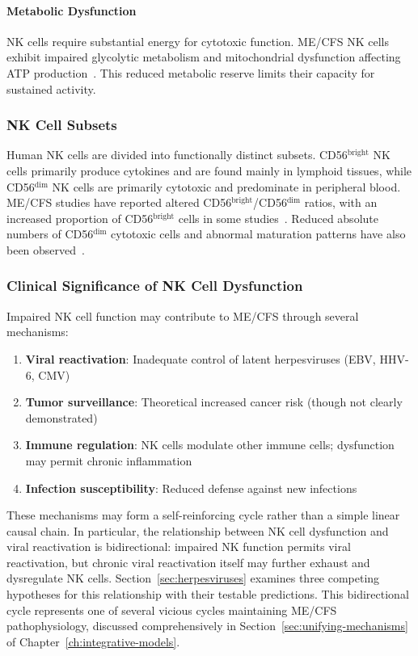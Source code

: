 \paragraph{Metabolic Dysfunction}
NK cells require substantial energy for cytotoxic function. ME/CFS NK cells exhibit impaired glycolytic metabolism and mitochondrial dysfunction affecting ATP production~\cite{Brenu2011}. This reduced metabolic reserve limits their capacity for sustained activity.

\subsubsection{NK Cell Subsets}

Human NK cells are divided into functionally distinct subsets. CD56$^{\text{bright}}$ NK cells primarily produce cytokines and are found mainly in lymphoid tissues, while CD56$^{\text{dim}}$ NK cells are primarily cytotoxic and predominate in peripheral blood. ME/CFS studies have reported altered CD56$^{\text{bright}}$/CD56$^{\text{dim}}$ ratios, with an increased proportion of CD56$^{\text{bright}}$ cells in some studies~\cite{Brenu2011NK,EatonFitch2019}. Reduced absolute numbers of CD56$^{\text{dim}}$ cytotoxic cells and abnormal maturation patterns have also been observed~\cite{EatonFitch2019}.

\subsubsection{Clinical Significance of NK Cell Dysfunction}

Impaired NK cell function may contribute to ME/CFS through several mechanisms:

\begin{enumerate}
    \item \textbf{Viral reactivation}: Inadequate control of latent herpesviruses (EBV, HHV-6, CMV)
    \item \textbf{Tumor surveillance}: Theoretical increased cancer risk (though not clearly demonstrated)
    \item \textbf{Immune regulation}: NK cells modulate other immune cells; dysfunction may permit chronic inflammation
    \item \textbf{Infection susceptibility}: Reduced defense against new infections
\end{enumerate}

These mechanisms may form a self-reinforcing cycle rather than a simple linear causal chain. In particular, the relationship between NK cell dysfunction and viral reactivation is bidirectional: impaired NK function permits viral reactivation, but chronic viral reactivation itself may further exhaust and dysregulate NK cells. Section~\ref{sec:herpesviruses} examines three competing hypotheses for this relationship with their testable predictions. This bidirectional cycle represents one of several vicious cycles maintaining ME/CFS pathophysiology, discussed comprehensively in Section~\ref{sec:unifying-mechanisms} of Chapter~\ref{ch:integrative-models}.

